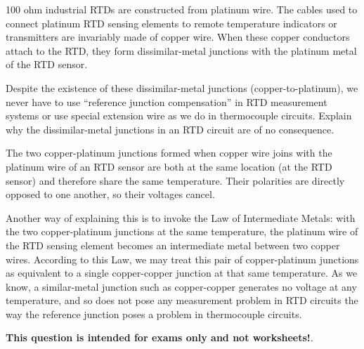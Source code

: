 

100 ohm industrial RTDs are constructed from platinum wire.  The cables used to connect platinum RTD sensing elements to remote temperature indicators or transmitters are invariably made of copper wire.  When these copper conductors attach to the RTD, they form dissimilar-metal junctions with the platinum metal of the RTD sensor.

\vskip 10pt

Despite the existence of these dissimilar-metal junctions (copper-to-platinum), we never have to use ``reference junction compensation'' in RTD measurement systems or use special extension wire as we do in thermocouple circuits.  Explain why the dissimilar-metal junctions in an RTD circuit are of no consequence.







The two copper-platinum junctions formed when copper wire joins with the platinum wire of an RTD sensor are both at the same location (at the RTD sensor) and therefore share the same temperature.  Their polarities are directly opposed to one another, so their voltages cancel.

\vskip 10pt

Another way of explaining this is to invoke the Law of Intermediate Metals: with the two copper-platinum junctions at the same temperature, the platinum wire of the RTD sensing element becomes an intermediate metal between two copper wires.  According to this Law, we may treat this pair of copper-platinum junctions as equivalent to a single copper-copper junction at that same temperature.  As we know, a similar-metal junction such as copper-copper generates no voltage at any temperature, and so does not pose any measurement problem in RTD circuits the way the reference junction poses a problem in thermocouple circuits.







{\bf This question is intended for exams only and not worksheets!}.



